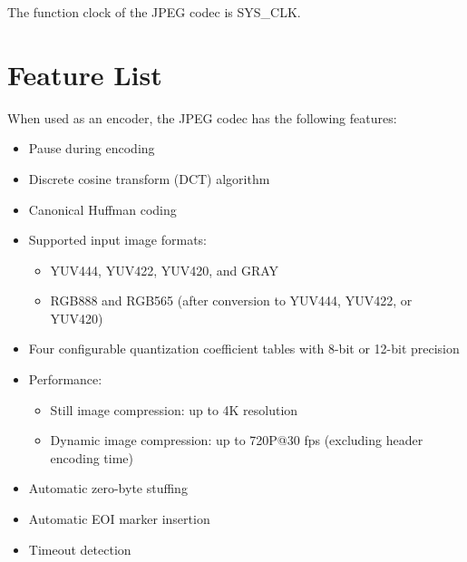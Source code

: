 \documentclass[main\_\_EN.tex]{subfiles}
\begin{document}
The function clock of the JPEG codec is SYS\_CLK.


\section{Feature List}
\label{sec:jpegcodec-features}

When used as an encoder, the JPEG codec has the following features:
\begin{itemize}
    \item Pause during encoding
    \item Discrete cosine transform (DCT) algorithm
    \item Canonical Huffman coding
    \item Supported input image formats:
        \begin{itemize}
            \item YUV444, YUV422, YUV420, and GRAY
            \item RGB888 and RGB565 (after conversion to YUV444, YUV422, or YUV420)
        \end{itemize}
    \item Four configurable quantization coefficient tables with 8-bit or 12-bit precision
    \item Performance:
        \begin{itemize}
            \item Still image compression: up to 4K resolution
            \item Dynamic image compression: up to 720P@30 fps (excluding header encoding time)
        \end{itemize}
    \item Automatic zero-byte stuffing
    \item Automatic EOI marker insertion
    \item Timeout detection
\end{itemize}
\end{document}
